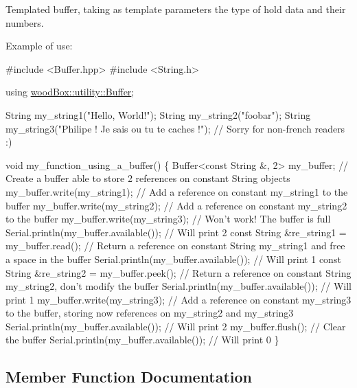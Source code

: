 Templated buffer, taking as template parameters the type of hold data and their numbers.

Example of use\+:


\begin{DoxyCode}
\textcolor{preprocessor}{#include <Buffer.hpp>}
\textcolor{preprocessor}{#include <String.h>}

\textcolor{keyword}{using} \mbox{\hyperlink{classwood_box_1_1utility_1_1_buffer}{woodBox::utility::Buffer}};

String my\_string1(\textcolor{stringliteral}{"Hello, World!"});
String my\_string2(\textcolor{stringliteral}{"foobar"});
String my\_string3(\textcolor{stringliteral}{"Philipe ! Je sais ou tu te caches !"}); \textcolor{comment}{// Sorry for non-french readers :)}

\textcolor{keywordtype}{void} my\_function\_using\_a\_buffer() \{
  Buffer<const String &, 2> my\_buffer; \textcolor{comment}{// Create a buffer able to store 2 references on constant String
       objects}
  my\_buffer.write(my\_string1); \textcolor{comment}{// Add a reference on constant my\_string1 to the buffer}
  my\_buffer.write(my\_string2); \textcolor{comment}{// Add a reference on constant my\_string2 to the buffer}
  my\_buffer.write(my\_string3); \textcolor{comment}{// Won't work! The buffer is full}
  Serial.println(my\_buffer.available()); \textcolor{comment}{// Will print 2}
  \textcolor{keyword}{const} String &re\_string1 = my\_buffer.read(); \textcolor{comment}{// Return a reference on constant String my\_string1 and free
       a space in the buffer}
  Serial.println(my\_buffer.available()); \textcolor{comment}{// Will print 1}
  \textcolor{keyword}{const} String &re\_string2 = my\_buffer.peek(); \textcolor{comment}{// Return a reference on constant String my\_string2, don't
       modify the buffer}
  Serial.println(my\_buffer.available()); \textcolor{comment}{// Will print 1}
  my\_buffer.write(my\_string3); \textcolor{comment}{// Add a reference on constant my\_string3 to the buffer, storing now
       references on my\_string2 and my\_string3}
  Serial.println(my\_buffer.available()); \textcolor{comment}{// Will print 2}
  my\_buffer.flush(); \textcolor{comment}{// Clear the buffer}
  Serial.println(my\_buffer.available()); \textcolor{comment}{// Will print 0}
\}
\end{DoxyCode}
 

\subsection{Member Function Documentation}
\mbox{\label{classwood_box_1_1utility_1_1_buffer_a2bcef18ccdd923a401608a257e4283ca}} 
